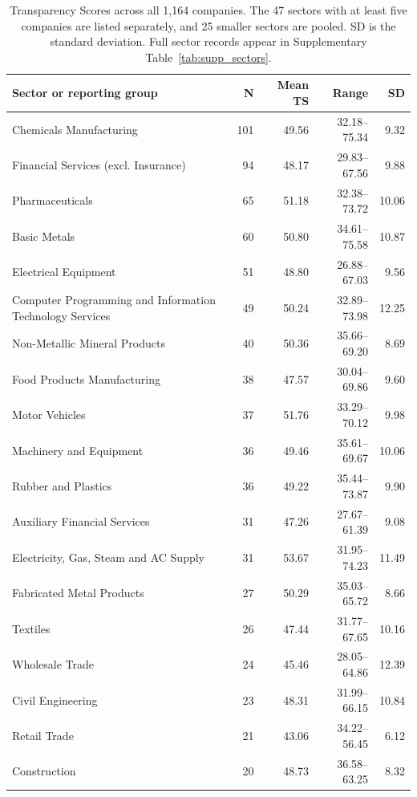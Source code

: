 \begin{table}[p]
\begin{singlepagetable}
\centering
\begingroup
\footnotesize
\setlength{\tabcolsep}{5pt}
\renewcommand{\arraystretch}{1.00}
\caption{Transparency Scores across all 1,164 companies. The 47 sectors with at least five companies are listed separately, and 25 smaller sectors are pooled. SD is the standard deviation. Full sector records appear in Supplementary Table~\ref{tab:supp_sectors}.}
\label{tab:all_sectors}
\begin{tabularx}{\linewidth}{@{}Yrrrr@{}}
\toprule\textbf{Sector or reporting group} & \textbf{N} & \textbf{Mean TS} & \textbf{Range} & \textbf{SD}\\\midrule
Chemicals Manufacturing & 101 & 49.56 & 32.18--75.34 & 9.32 \\
Financial Services (excl. Insurance) & 94 & 48.17 & 29.83--67.56 & 9.88 \\
Pharmaceuticals & 65 & 51.18 & 32.38--73.72 & 10.06 \\
Basic Metals & 60 & 50.80 & 34.61--75.58 & 10.87 \\
Electrical Equipment & 51 & 48.80 & 26.88--67.03 & 9.56 \\
Computer Programming and Information Technology Services & 49 & 50.24 & 32.89--73.98 & 12.25 \\
Non-Metallic Mineral Products & 40 & 50.36 & 35.66--69.20 & 8.69 \\
Food Products Manufacturing & 38 & 47.57 & 30.04--69.86 & 9.60 \\
Motor Vehicles & 37 & 51.76 & 33.29--70.12 & 9.98 \\
Machinery and Equipment & 36 & 49.46 & 35.61--69.67 & 10.06 \\
Rubber and Plastics & 36 & 49.22 & 35.44--73.87 & 9.90 \\
Auxiliary Financial Services & 31 & 47.26 & 27.67--61.39 & 9.08 \\
Electricity, Gas, Steam and AC Supply & 31 & 53.67 & 31.95--74.23 & 11.49 \\
Fabricated Metal Products & 27 & 50.29 & 35.03--65.72 & 8.66 \\
Textiles & 26 & 47.44 & 31.77--67.65 & 10.16 \\
Wholesale Trade & 24 & 45.46 & 28.05--64.86 & 12.39 \\
Civil Engineering & 23 & 48.31 & 31.99--66.15 & 10.84 \\
Retail Trade & 21 & 43.06 & 34.22--56.45 & 6.12 \\
Construction & 20 & 48.73 & 36.58--63.25 & 8.32 \\

\end{tabularx}
\end{singlepagetable}
\end{table}
